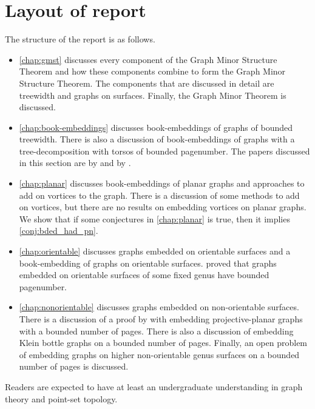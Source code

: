 \section{Layout of report}
The structure of the report is as follows.
\begin{itemize}
	\item \cref{chap:gmst} discusses every component of the Graph Minor Structure Theorem and how these components combine to form the Graph Minor Structure Theorem. The components that are discussed in detail are treewidth and graphs on surfaces. Finally, the Graph Minor Theorem is discussed.
	\item \cref{chap:book-embeddings} discusses book-embeddings of graphs of bounded treewidth. There is also a discussion of book-embeddings of graphs with a tree-decomposition with torsos of bounded pagenumber. The papers discussed in this section are by \textcite{hickingbothamStackNumberCliqueSum2023} and by \textcite{ganleyPagenumberTrees2001}. 
	\item \cref{chap:planar} discusses book-embeddings of planar graphs and approaches to add on vortices to the graph. There is a discussion of some methods to add on vortices, but there are no results on embedding vortices on planar graphs. We show that if some conjectures in \cref{chap:planar} is true, then it implies \cref{conj:bded_had_pn}.
	\item \cref{chap:orientable} discusses graphs embedded on orientable surfaces and a book-embedding of graphs on orientable surfaces. \textcite{heathPagenumberGenusGraphs1992} proved that graphs embedded on orientable surfaces of some fixed genus have bounded pagenumber. 
	\item \cref{chap:nonorientable} discusses graphs embedded on non-orientable surfaces. There is a discussion of a proof by \textcite{nakamotoBookEmbeddingProjectiveplanar2015} with embedding projective-planar graphs with a bounded number of pages. There is also a discussion of embedding Klein bottle graphs on a bounded number of pages. Finally, an open problem of embedding graphs on higher non-orientable genus surfaces on a bounded number of pages is discussed.
\end{itemize}

Readers are expected to have at least an undergraduate understanding in graph theory and point-set topology. 

